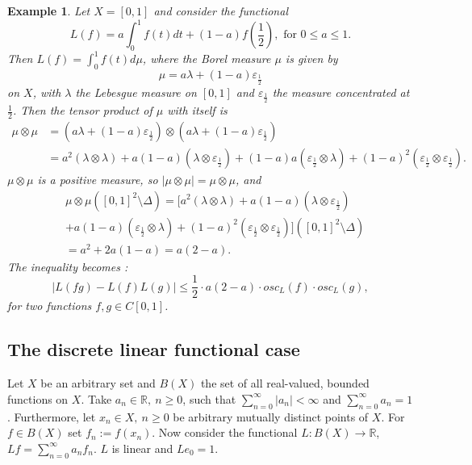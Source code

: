 \documentclass[12pt,leqno,a4paper,dvips,twoside]{article}
\newcommand*{\R}{\ensuremath{\mathbb{R}}}               %
\newtheorem{exem}[thm]{Example}%
\begin{document}
{\begin{exem}
	Let $X=[0,1]$ and consider the functional
	\begin{equation*}
L(f)=a\int^{1}_{0}{f(t)dt}+(1-a)f\left(\frac{1}{2}\right), \text{ for }0\leq a \leq 1.
	\end{equation*}
Then $L(f)=\int^{1}_{0}{f(t)d\mu}$, where the Borel measure $\mu$ is given by 
	\begin{equation*}	
	\mu=a\lambda+(1-a)\varepsilon_{\frac{1}{2}}
	\end{equation*}	
on $X$, with $\lambda$ the Lebesgue measure on $[0,1]$ and $\varepsilon_{\frac{1}{2}}$ the measure concentrated at $\frac{1}{2}$. Then the tensor product of $\mu$ with itself is
\begin{align*}
	\mu\otimes\mu&=\left(a\lambda+(1-a)\varepsilon_{\frac{1}{2}}\right)\otimes \left(a\lambda+(1-a)\varepsilon_{\frac{1}{2}}\right)\\
	&=a^2(\lambda\otimes\lambda)+a(1-a)(\lambda\otimes\varepsilon_{\frac{1}{2}})+(1-a)a(\varepsilon_{\frac{1}{2}}\otimes\lambda)+(1-a)^2(\varepsilon_{\frac{1}{2}}\otimes\varepsilon_{\frac{1}{2}}).
\end{align*}
$\mu\otimes\mu$ is a positive measure, so $\left|\mu\otimes\mu\right|=\mu\otimes\mu$, and 
	\begin{align*}
		&\mu\otimes\mu\left([0,1]^2\setminus \Delta\right)=[a^2(\lambda\otimes\lambda)+a(1-a)(\lambda\otimes \varepsilon_{\frac{1}{2}})\\
		&+a(1-a)(\varepsilon_{\frac{1}{2}}\otimes\lambda)+(1-a)^2 (\varepsilon_{\frac{1}{2}}\otimes \varepsilon_{\frac{1}{2}})]\left([0,1]^2\setminus \Delta\right)\\
		&=a^2+2a(1-a)=a(2-a).
	\end{align*}
The inequality becomes :
	\begin{equation*}
	\left|L(fg)-L(f)L(g)\right|\leq \frac{1}{2}\cdot a(2-a)\cdot osc_L(f)\cdot osc_L(g),
	\end{equation*}
for two functions $f,g\in C[0,1]$.
\end{exem}

\subsection{The discrete linear functional case}

Let $X$ be an arbitrary set and $B(X)$ the set of all real-valued, bounded functions on $X$. Take $a_n\in \R,\ n\geq 0$, such that 
$\sum^{\infty}_{n=0}{\left|a_n\right|}<\infty$ and $\sum^{\infty}_{n=0}{a_n}=1$. Furthermore, let $x_n\in X,\ n\geq 0$ be arbitrary mutually distinct points of $X$. For $f\in B(X)$ set $f_n:=f(x_n)$. Now consider the functional $L:B(X)\to \R$, $Lf=\sum^{\infty}_{n=0}{a_nf_n}$. $L$ is linear and $Le_0=1$. 

}
\end{document}
